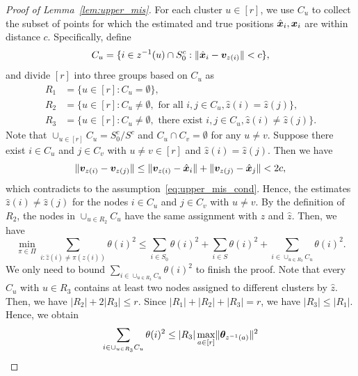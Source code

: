 \documentclass[lettersize,onecolumn,journal]{IEEEtran}
\theoremstyle{definition}
\theoremstyle{definition}
\def\fixme#1#2{\textbf{\color{red}[FIXME (#1): #2]}}
\begin{document}
\begin{proof}[Proof of Lemma~\ref{lem:upper_mis}] 

For each cluster $u\in[r]$, we use $C_u$ to collect the subset of points for which the estimated and true positions $\hat {\bm x}_i, \bm x_i$ are within distance $c$. Specifically, define
\begin{equation}
    C_u = \{ i \in z^{-1}(u) \cap S_0^c: \lVert\hat {\bm x}_i - \bm{v}_{z(i)}\rVert < c \},
\end{equation}
and divide $[r]$ into three groups based on $C_u$ as 
\begin{align}
    R_1 &= \{ u \in [r]: C_u = \emptyset \},\\
    R_2 &= \{ u \in [r]: C_u \neq \emptyset, \text{ for all } i, j \in C_u, \hat z(i) = \hat z(j) \},\\
    R_3 &= \{ u \in [r]: C_u \neq \emptyset, \text{ there exist } i, j \in C_u, \hat z(i) \neq \hat z(j) \}.
\end{align}
Note that $\cup_{u \in [r]}C_u = S_0^c/S^c$ and $C_u \cap C_v = \emptyset$ for any $u \neq v$. Suppose there exist $ i \in C_u$ and $j \in C_v$ with $u \neq v \in [r]$ and $\hat z(i) = \hat z(j)$. Then we have 
\begin{equation}
    \lVert\bm{v}_{z(i)} - \bm{v}_{z(j)} \rVert \leq  \lVert\bm{v}_{z(i)} - \hat {\bm x}_{i} \rVert + \lVert\bm{v}_{z(j)} - \hat {\bm x}_j \rVert < 2c,
\end{equation}
which contradicts to the assumption~\eqref{eq:upper_mis_cond}. Hence, the estimates $\hat z(i) \neq \hat z(j)$ for the nodes $ i \in C_u$ and $j \in C_v$ with $u \neq v$. By the definition of $R_2$, the nodes in $\cup_{u \in R_2} C_u$ have the same assignment with $z$ and $\hat z$. Then, 
we have 
\begin{equation}
    \min_{\pi \in \Pi} \sum_{i : \hat z(i) \neq \pi(z(i))} \theta(i)^2 \leq \sum_{i \in S_0} \theta(i)^2 + \sum_{i \in S} \theta(i)^2 + \sum_{ i \in \cup_{u \in R_3} C_u} \theta(i)^2.
\end{equation}
 We only need to bound $\sum_{ i \in \cup_{u \in R_3} C_u} \theta(i)^2$ to finish the proof. Note that every $C_u$ with $u \in R_3$ contains at least two nodes assigned to different clusters by $\hat z$. Then, we have $|R_2| + 2 |R_3| \leq r$. Since $|R_1| + |R_2| + |R_3| = r$, we have $|R_3| \leq |R_1|$. Hence, we obtain
\begin{align}
    \sum_{ i \in \cup_{u \in R_3} C_u} \theta(i)^2 &\leq |R_3| \max_{a \in [r]} \onormSize{}{\mtheta_{z^{-1}(a)}}^2 \\

\end{align}
\end{proof}
\end{document}
